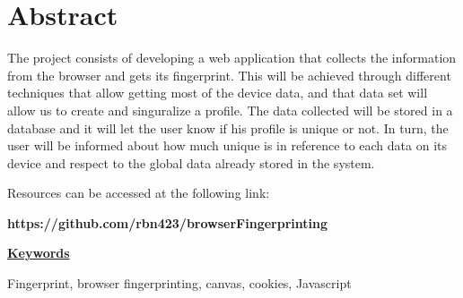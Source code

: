 \chapter*{Abstract}

The project consists of developing a web application that collects the information from the browser and gets its fingerprint. This will be achieved through different techniques that allow getting most of the device data, and that data set will allow us to create and singuralize a profile. The data collected will be stored in a database and it will let the user know if his profile is unique or not. In turn, the user will be informed about how much unique is in reference to each data on its device and respect to the global data already stored in the system. \par

Resources can be accessed at the following link: \par
\noindent
\textbf{https://github.com/rbn423/browserFingerprinting} \par
\vspace{12mm}
\noindent
\underline{\Large{\textbf{Keywords}}}\par
\vspace{7mm}
\noindent
\normalsize{Fingerprint, browser fingerprinting, canvas, cookies, Javascript}